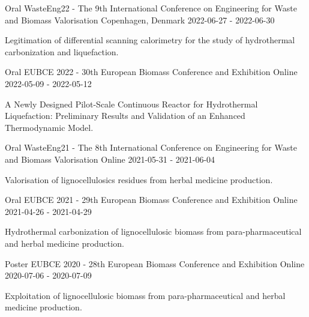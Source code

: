 
\begin{cventries}

\cventry
{Oral}
{WasteEng22 - The 9th International Conference on Engineering for Waste and Biomass Valorisation}
{Copenhagen, Denmark}
{2022-06-27 - 2022-06-30}
{\vspace{-4.0mm}
\begin{justify}
\begin{itemize}[leftmargin=0ex, nosep, noitemsep]
\setlength{\parskip}{0pt}
\renewcommand{\labelitemi}{\bullet}
{Legitimation of differential scanning calorimetry for the study of hydrothermal carbonization and liquefaction.}
\end{itemize}
\end{justify}}
\cventry
{Oral}
{EUBCE 2022 - 30th European Biomass Conference and Exhibition}
{Online}
{2022-05-09 - 2022-05-12}
{\vspace{-4.0mm}
\begin{justify}
\begin{itemize}[leftmargin=0ex, nosep, noitemsep]
\setlength{\parskip}{0pt}
\renewcommand{\labelitemi}{\bullet}
{A Newly Designed Pilot-Scale Continuous Reactor for Hydrothermal Liquefaction: Preliminary Results and Validation of an Enhanced Thermodynamic Model.}
\end{itemize}
\end{justify}}
\cventry
{Oral}
{WasteEng21 - The 8th International Conference on Engineering for Waste and Biomass Valorisation}
{Online}
{2021-05-31 - 2021-06-04}
{\vspace{-4.0mm}
\begin{justify}
\begin{itemize}[leftmargin=0ex, nosep, noitemsep]
\setlength{\parskip}{0pt}
\renewcommand{\labelitemi}{\bullet}
{Valorisation of lignocellulosics residues from herbal medicine production.}
\end{itemize}
\end{justify}}
\cventry
{Oral}
{EUBCE 2021 - 29th European Biomass Conference and Exhibition}
{Online}
{2021-04-26 - 2021-04-29}
{\vspace{-4.0mm}
\begin{justify}
\begin{itemize}[leftmargin=0ex, nosep, noitemsep]
\setlength{\parskip}{0pt}
\renewcommand{\labelitemi}{\bullet}
{Hydrothermal carbonization of lignocellulosic biomass from para-pharmaceutical and herbal medicine production.}
\end{itemize}
\end{justify}}
\cventry
{Poster}
{EUBCE 2020 - 28th European Biomass Conference and Exhibition}
{Online}
{2020-07-06 - 2020-07-09}
{\vspace{-4.0mm}
\begin{justify}
\begin{itemize}[leftmargin=0ex, nosep, noitemsep]
\setlength{\parskip}{0pt}
\renewcommand{\labelitemi}{\bullet}
{Exploitation of lignocellulosic biomass from para-pharmaceutical and herbal medicine production.}
\end{itemize}
\end{justify}}
\end{cventries}